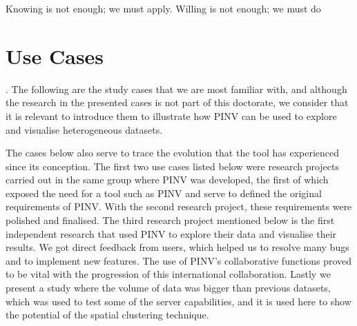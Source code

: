 \begin{savequote}[75mm] 
Knowing is not enough; we must apply. Willing is not enough; we must do
\end{savequote}

\chapter{Use Cases} \label{section:use_cases}

. The following are the study cases that we are most familiar with, and although the research in the presented cases is not part of this doctorate, we consider that it is relevant to introduce them to illustrate how PINV can be used to explore and visualise heterogeneous datasets. 

The cases below also serve to trace the evolution that the tool has experienced since its conception. The first two use cases listed below were research projects carried out in the same group where PINV was developed, the first of which exposed the need for a tool such as PINV and serve to defined the original requirements of PINV. With the second research project, these requirements were polished and finalised.  The third research project mentioned below is the first independent research that used PINV to explore their data and visualise their results. We got direct feedback from users, which helped us to resolve many bugs and to implement new features. The use of PINV's collaborative functions proved to be vital with the progression of this international collaboration. Lastly we present a study where the volume of data was bigger than previous datasets, which was used to test some of the server capabilities, and it is used here to show the potential of the spatial clustering technique.

